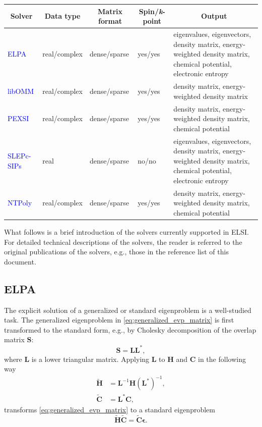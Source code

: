 \documentclass{report}
\begin{document}
\begin{tabular}[]{|p{20mm}|p{25mm}|p{25mm}|p{25mm}|p{70mm}|}
\hline
\multicolumn{1}{|c|}{\textbf{Solver}} & \multicolumn{1}{c|}{\textbf{Data type}} & \multicolumn{1}{c|}{\textbf{Matrix format}} & \multicolumn{1}{c|}{\textbf{Spin/\textit{k}-point}} & \multicolumn{1}{c|}{\textbf{Output}}\\
\hline
\textcolor{blue}{ELPA}       & real/complex & dense/sparse & yes/yes & eigenvalues, eigenvectors, density matrix, energy-weighted density matrix, chemical potential, electronic entropy\\
\hline
\textcolor{blue}{libOMM}     & real/complex & dense/sparse & yes/yes & density matrix, energy-weighted density matrix\\
\hline
\textcolor{blue}{PEXSI}      & real/complex & dense/sparse & yes/yes & density matrix, energy-weighted density matrix, chemical potential\\
\hline
\textcolor{blue}{SLEPc-SIPs} & real         & dense/sparse & no/no   & eigenvalues, eigenvectors, density matrix, energy-weighted density matrix, chemical potential, electronic entropy\\
\hline
\textcolor{blue}{NTPoly}     & real/complex & dense/sparse & yes/yes & density matrix, energy-weighted density matrix, chemical potential\\
\hline
\end{tabular}

What follows is a brief introduction of the solvers currently supported in ELSI.  For detailed technical descriptions of the solvers, the reader is referred to the original publications of the solvers, e.g., those in the reference list of this document.

\subsection{ELPA}
\label{subsec:solvers_elpa}
The explicit solution of a generalized or standard eigenproblem is a well-studied task.  The generalized eigenproblem in \ref{eq:generalized_evp_matrix} is first transformed to the standard form, e.g., by Cholesky decomposition of the overlap matrix $\boldsymbol{S}$:
\begin{equation}
\label{eq:cholesky}
\boldsymbol{S} = \boldsymbol{L} \boldsymbol{L}^* ,
\end{equation}
where $\boldsymbol{L}$ is a lower triangular matrix.  Applying $\boldsymbol{L}$ to $\boldsymbol{H}$ and $\boldsymbol{C}$ in the following way
\begin{equation}
\label{eq:to_standard}
\begin{split}
\boldsymbol{\tilde{H}} & = \boldsymbol{L}^{-1} \boldsymbol{H} (\boldsymbol{L}^*)^{-1} ,\\
\boldsymbol{\tilde{C}} & = \boldsymbol{L}^* \boldsymbol{C} ,
\end{split}
\end{equation}
transforms \ref{eq:generalized_evp_matrix} to a standard eigenproblem
\begin{equation}
\label{eq:standard_evp}
\boldsymbol{\tilde{H}} \boldsymbol{\tilde{C}} = \boldsymbol{\tilde{C}} \boldsymbol{\epsilon} .
\end{equation}
\end{document}
